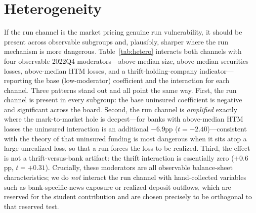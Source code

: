 \documentclass[12pt]{article}
\begin{document}
\section{Heterogeneity}\label{sec:het}
If the run channel is the market pricing genuine run vulnerability, it should be present
across observable subgroups and, plausibly, sharper where the run mechanism is more
dangerous. Table~\ref{tab:hetero} interacts both channels with four observable 2022Q4
moderators---above-median size, above-median securities losses, above-median HTM losses, and
a thrift-holding-company indicator---reporting the base (low-moderator) coefficient and the
interaction for each channel. Three patterns stand out and all point the same way. First, the
run channel is present in every subgroup: the base uninsured coefficient is negative and
significant across the board. Second, the run channel is \emph{amplified} exactly where the
mark-to-market hole is deepest---for banks with above-median HTM losses the uninsured
interaction is an additional $-6.9$pp ($t=-2.40$)---consistent with the theory of
\citet{jiang2024} that uninsured funding is most dangerous when it sits atop a large
unrealized loss, so that a run forces the loss to be realized. Third, the effect is not a
thrift-versus-bank artifact: the thrift interaction is essentially zero ($+0.6$pp,
$t=+0.31$). Crucially, these moderators are all observable balance-sheet characteristics; we
do \emph{not} interact the run channel with hand-collected variables such as
bank-specific-news exposure or realized deposit outflows, which are reserved for the student
contribution and are chosen precisely to be orthogonal to that reserved test.
\end{document}
